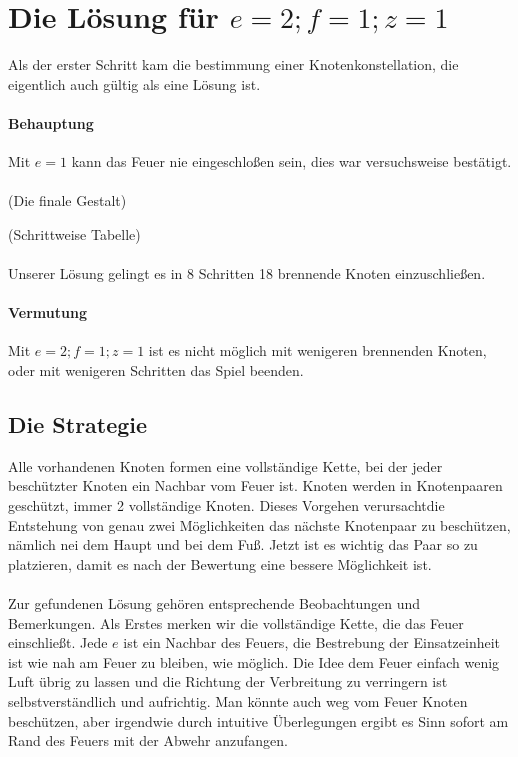 \documentclass{article}
\begin{document}
\section{Die Lösung für $e=2; f=1; z=1$}
Als der erster Schritt kam die bestimmung einer Knotenkonstellation, die eigentlich auch gültig als eine Lösung ist.

\paragraph{Behauptung} Mit $e=1$ kann das Feuer nie eingeschloßen sein, dies war versuchsweise bestätigt.

\paragraph{}

(Die finale Gestalt)

(Schrittweise Tabelle)

\paragraph{}

Unserer Lösung gelingt es in 8 Schritten 18 brennende Knoten einzuschließen. 

\paragraph{Vermutung} Mit $e=2; f=1; z=1$ ist es nicht möglich mit wenigeren brennenden Knoten, oder mit wenigeren Schritten das Spiel beenden.

\subsection{Die Strategie} Alle vorhandenen Knoten formen eine vollständige Kette, bei der jeder beschützter Knoten ein Nachbar vom Feuer ist. Knoten werden in Knotenpaaren geschützt, immer 2 vollständige Knoten. Dieses Vorgehen verursachtdie Entstehung von genau zwei Möglichkeiten das nächste Knotenpaar zu beschützen, nämlich nei dem Haupt und bei dem Fuß. Jetzt ist es wichtig das Paar so zu platzieren, damit es nach der Bewertung eine bessere Möglichkeit ist. 

\paragraph{} Zur gefundenen Lösung gehören entsprechende Beobachtungen und Bemerkungen. Als Erstes merken wir die vollständige Kette, die das Feuer einschließt. Jede $e$ ist ein Nachbar des Feuers, die Bestrebung der Einsatzeinheit ist wie nah am Feuer zu bleiben, wie möglich. Die Idee dem Feuer einfach wenig Luft übrig zu lassen und die Richtung der Verbreitung zu verringern ist selbstverständlich und aufrichtig. Man könnte auch weg vom Feuer Knoten beschützen, aber irgendwie durch intuitive Überlegungen ergibt es Sinn sofort am Rand des Feuers mit der Abwehr anzufangen. 
\end{document}
